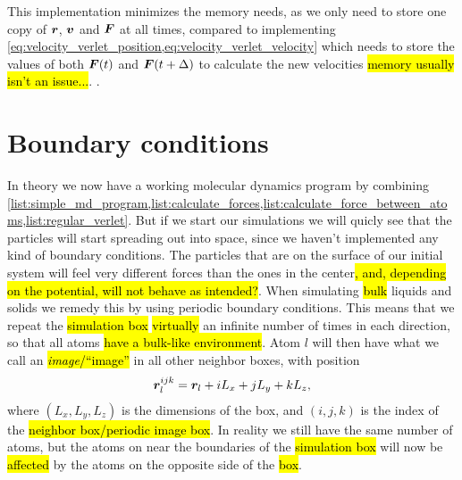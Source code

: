 This implementation minimizes the memory needs, as we only need to store one copy of $\boldsymbol{r}$, $\boldsymbol{v}$ and $\boldsymbol{F}$ at all times, compared to implementing \cref{eq:velocity_verlet_position,eq:velocity_verlet_velocity} which needs to store the values of both $\boldsymbol{F}(t)$ and $\boldsymbol{F}(t+\Delta)$ to calculate the new velocities \hl{memory usually isn't an issue...}. . 

\section{Boundary conditions}
In theory we now have a working molecular dynamics program by combining \cref{list:simple_md_program,list:calculate_forces,list:calculate_force_between_atoms,list:regular_verlet}. But if we start our simulations we will quicly see that the particles will start spreading out into space, since we haven't implemented any kind of boundary conditions. The particles that are on the surface of our initial system will feel very different forces than the ones in the center\hl{, and, depending on the potential, will not behave as intended?}. When simulating \hl{bulk} liquids and solids we remedy this by using periodic boundary conditions. This means that we repeat the \hl{simulation box} \hl{virtually} an infinite number of times in each direction, so that all atoms \hl{have a bulk-like environment}. Atom $l$ will then have what we call an \hl{\emph{image}/``image''} in all other neighbor boxes, with position
\begin{align}
    \boldsymbol{r}_l^{ijk} = \boldsymbol{r}_l + iL_x + jL_y + kL_z,
    \label{eq:pbc_positions}
\end{align}
where $(L_x, L_y, L_z)$ is the dimensions of the box, and $(i, j, k)$ is the index of the \hl{neighbor box/periodic image box}. In reality we still have the same number of atoms, but the atoms on near the boundaries of the \hl{simulation box} will now be \hl{affected} by the atoms on the opposite side of the \hl{box}.

